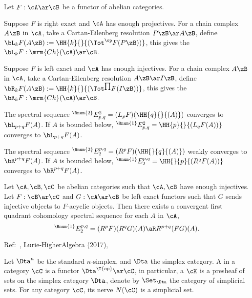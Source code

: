 \documentclass[article, a4paper, twoside]{universal}
\begin{document}
\begin{dfn}[5.7.4, 5.7.9]
    Let $F:\cA\ar\cB$ be a functor of abelian categories.

    \begin{itm}
        \item Suppose $F$ is right exact and $\cA$ has enough projectives. For a chain complex $A\zB$ in $\cA$, take a Cartan-Eilenberg resolution $P\zB\ar A\zB$, define $\bL_{k}F(A\zB):=\HH{k}{}{(\Tot^{\op}F(P\zB))}$, this gives the  $\bL_{k}F:\mrm{Ch}(\cA)\ar\cB$.
        \item Suppose $F$ is left exact and $\cA$ has enough injectives. For a chain complex $A\zB$ in $\cA$, take a Cartan-Eilenberg resolution $A\zB\ar I\zB$, define $\bR_{k}F(A\zB):=\HH{k}{}{(\Tot^{\prod}F(I\zB))}$, this gives the  $\bR_{k}F:\mrm{Ch}(\cA)\ar\cB$.
    \end{itm}

\end{dfn}

\begin{thm}[5.7.6, 5.7.9]
    The spectral sequence ${}^{\Rnum{2}}E_{p,q}^{2}=(L_{p}F)(\HH{q}{}{(A)})$ converges to $\bL_{p+q}F(A)$. If $A$ is bounded below, ${}^{\Rnum{1}}E_{p,q}^{2}=\HH{p}{}{(L_{q}F(A))}$ converges to $\bL_{p+q}F(A)$.

    The spectral sequence ${}^{\Rnum{2}}E_{2}^{p,q}=(R^{p}F)(\HH{}{q}{(A)})$ weakly converges to $\bR^{p+q}F(A)$. If $A$ is bounded below, ${}^{\Rnum{1}}E_{2}^{p,q}=\HH{}{p}{(R^{q}F(A))}$ converges to $\bR^{p+q}F(A)$.
\end{thm}

\begin{thm}[Grothendieck, 5.8.3]
    Let $\cA,\cB,\cC$ be abelian categories such that $\cA,\cB$ have enough injectives. Let $F:\cB\ar\cC$ and $G:\cA\ar\cB$ be left exact functors such that $G$ sends injective objects to $F$-acyclic objects. Then there exists a convergent first quadrant cohomology spectral sequence for each $A$ in $\cA$,
    \[
        {}^{\Rnum{1}}E_{2}^{p,q}=(R^{p}F)(R^{q}G)(A)\aR R^{p+q}(FG)(A).
    \]
\end{thm}

Ref:~\cite{Lurie2009}, Lurie-HigherAlgebra (2017),


\begin{dfn}
    Let $\Dta^{n}$ be the standard $n$-simplex, and $\Dta$ the simplex category. A  in a category $\cC$ is a functor $\Dta^{\T{op}}\ar\cC$, in particular, a  $\cK$ is a presheaf of sets on the simplex category $\Dta$, denote by $\Set_{\Dta}$ the category of simplicial sets. For any category $\cC$, its nerve $N(\cC)$ is a simplicial set.
\end{dfn}
\end{document}
